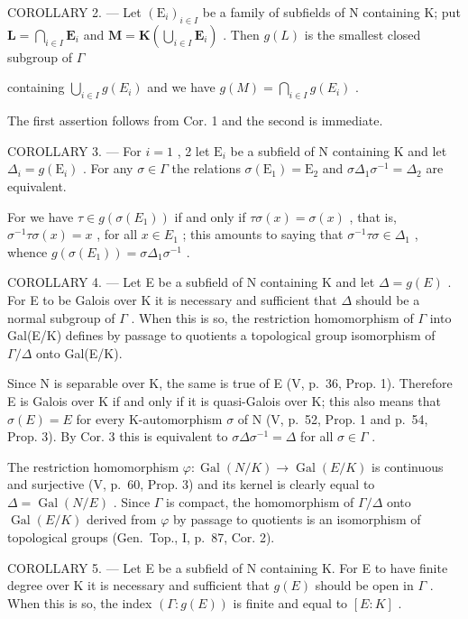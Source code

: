 COROLLARY 2. --- Let \((\mathrm{E}_i)_{i\in I}\) be a family of subfields of N containing K; put \(\mathbf{L} = \bigcap_{i\in I}\mathbf{E}_i\) and \(\mathbf{M} = \mathbf{K}\left(\bigcup_{i\in I}\mathbf{E}_i\right)\) . Then \(g(L)\) is the smallest closed subgroup of \(\Gamma\)

containing \(\bigcup_{i\in I}g(E_i)\) and we have \(g(M) = \bigcap_{i\in I}g(E_i)\) .

The first assertion follows from Cor. 1 and the second is immediate.

COROLLARY 3. --- For \(i=1\) , 2 let \(\mathrm{E}_{i}\) be a subfield of N containing K and let \(\Delta_{i}=g(\mathrm{E}_{i})\) . For any \(\sigma\in\Gamma\) the relations \(\sigma(\mathrm{E}_{1})=\mathrm{E}_{2}\) and \(\sigma\Delta_{1}\sigma^{-1}=\Delta_{2}\) are equivalent.

For we have \(\tau \in g(\sigma(E_1))\) if and only if \(\tau\sigma(x) = \sigma(x)\) , that is, \(\sigma^{-1}\tau\sigma(x) = x\) , for all \(x \in E_1\) ; this amounts to saying that \(\sigma^{-1}\tau\sigma \in \Delta_1\) , whence \(g(\sigma(E_1)) = \sigma\Delta_1\sigma^{-1}\) .

COROLLARY 4. --- Let E be a subfield of N containing K and let \(\Delta = g(E)\) . For E to be Galois over K it is necessary and sufficient that \(\Delta\) should be a normal subgroup of \(\Gamma\) . When this is so, the restriction homomorphism of \(\Gamma\) into Gal(E/K) defines by passage to quotients a topological group isomorphism of \(\Gamma/\Delta\) onto Gal(E/K).

Since N is separable over K, the same is true of E (V, p.~36, Prop. 1). Therefore E is Galois over K if and only if it is quasi-Galois over K; this also means that \(\sigma(E) = E\) for every K-automorphism \(\sigma\) of N (V, p.~52, Prop. 1 and p.~54, Prop. 3). By Cor. 3 this is equivalent to \(\sigma\Delta\sigma^{-1} = \Delta\) for all \(\sigma \in \Gamma\) .

The restriction homomorphism \(\varphi: \operatorname{Gal}(N/K) \to \operatorname{Gal}(E/K)\) is continuous and surjective (V, p.~60, Prop. 3) and its kernel is clearly equal to \(\Delta = \operatorname{Gal}(N/E)\) . Since \(\Gamma\) is compact, the homomorphism of \(\Gamma/\Delta\) onto \(\operatorname{Gal}(E/K)\) derived from \(\varphi\) by passage to quotients is an isomorphism of topological groups (Gen.~Top., I, p.~87, Cor. 2).

COROLLARY 5. --- Let E be a subfield of N containing K. For E to have finite degree over K it is necessary and sufficient that \(g(E)\) should be open in \(\Gamma\) . When this is so, the index \((\Gamma:g(E))\) is finite and equal to \([E:K]\) .

